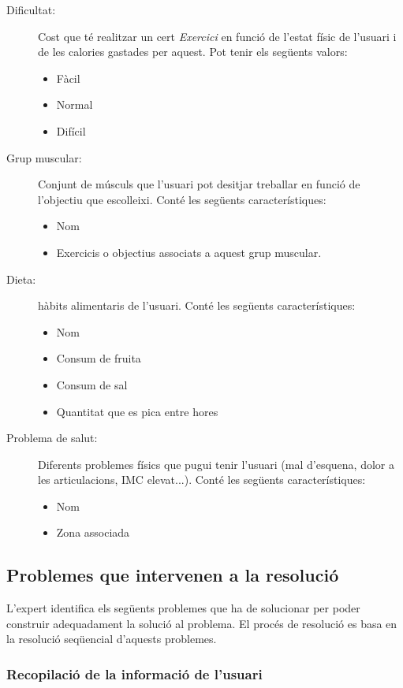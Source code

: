\documentclass[a4paper, 12pt, UTF8]{article}
\begin{document}
\begin{description}
	\item[Dificultat:] Cost que té realitzar un cert \emph{Exercici} en funció de l'estat físic de l'usuari i de les calories gastades per aquest. Pot tenir els següents valors:
	\begin{itemize}
		\item Fàcil
		\item Normal
		\item Difícil
	\end{itemize}
	
	\item[Grup muscular:] Conjunt de músculs que l'usuari pot desitjar treballar en funció de l'objectiu que escolleixi. Conté les següents característiques:
	\begin{itemize}
		\item Nom
		\item Exercicis o objectius associats a aquest grup muscular.
	\end{itemize}
	
	\item[Dieta:] hàbits alimentaris de l'usuari. Conté les següents característiques:
	\begin{itemize}
		\item Nom
		\item Consum de fruita
		\item Consum de sal
		\item Quantitat que es pica entre hores
	\end{itemize}
	\item[Problema de salut:] Diferents problemes físics que pugui tenir l'usuari (mal d'esquena, dolor a les articulacions, IMC elevat...). Conté les següents característiques:
	\begin{itemize}
		\item Nom
		\item Zona associada
	\end{itemize}
\end{description}

\subsection{Problemes que intervenen a la resolució}

L'expert identifica els següents problemes que ha de solucionar per poder construir adequadament la solució al problema. El procés de resolució es basa en la resolució seqüencial d'aquests problemes.

\subsubsection*{Recopilació de la informació de l'usuari}
\end{document}
